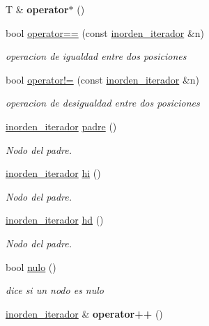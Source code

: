 \begin{DoxyCompactItemize}
\mbox{\label{classArbolBinario_1_1inorden__iterador_a69442e2ed391de0de15197fa4bce1347}} 
T \& {\bfseries operator$\ast$} ()
\item 
bool \hyperlink{classArbolBinario_1_1inorden__iterador_aeb20011529e5d235be3f001d55ca330f}{operator==} (const \hyperlink{classArbolBinario_1_1inorden__iterador}{inorden\+\_\+iterador} \&n)
\begin{DoxyCompactList}\small\item\em operacion de igualdad entre dos posiciones \end{DoxyCompactList}\item 
bool \hyperlink{classArbolBinario_1_1inorden__iterador_a783f6a48c29594dde6ddf8f477989ac2}{operator!=} (const \hyperlink{classArbolBinario_1_1inorden__iterador}{inorden\+\_\+iterador} \&n)
\begin{DoxyCompactList}\small\item\em operacion de desigualdad entre dos posiciones \end{DoxyCompactList}\item 
\hyperlink{classArbolBinario_1_1inorden__iterador}{inorden\+\_\+iterador} \hyperlink{classArbolBinario_1_1inorden__iterador_a3beb2133e8319be6791854b9c470a9c5}{padre} ()
\begin{DoxyCompactList}\small\item\em Nodo del padre. \end{DoxyCompactList}\item 
\hyperlink{classArbolBinario_1_1inorden__iterador}{inorden\+\_\+iterador} \hyperlink{classArbolBinario_1_1inorden__iterador_a37fae9f00d9a8ac43ddd0a36ad5873c4}{hi} ()
\begin{DoxyCompactList}\small\item\em Nodo del padre. \end{DoxyCompactList}\item 
\hyperlink{classArbolBinario_1_1inorden__iterador}{inorden\+\_\+iterador} \hyperlink{classArbolBinario_1_1inorden__iterador_a05e0bd4966015fb259e53c230ff2eab0}{hd} ()
\begin{DoxyCompactList}\small\item\em Nodo del padre. \end{DoxyCompactList}\item 
bool \hyperlink{classArbolBinario_1_1inorden__iterador_afcd755553d0a646627a39d4b44ee2897}{nulo} ()
\begin{DoxyCompactList}\small\item\em dice si un nodo es nulo \end{DoxyCompactList}\item 
\mbox{\label{classArbolBinario_1_1inorden__iterador_a9df6040a8f315f92fe163ec0aefb2da7}} 
\hyperlink{classArbolBinario_1_1inorden__iterador}{inorden\+\_\+iterador} \& {\bfseries operator++} ()
\end{DoxyCompactItemize}
